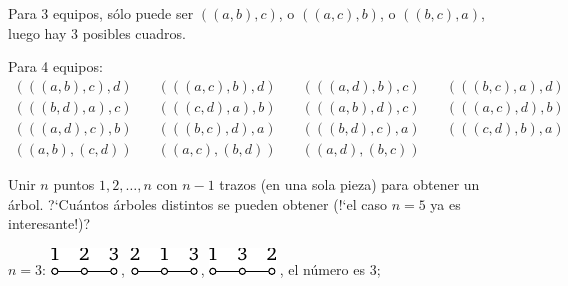 \documentclass[12pt]{article}  %
\begin{document}
Para 3 equipos, s\'olo puede ser $((a,b),c)$, o $((a,c),b)$, o $((b,c),a)$, luego hay 3 posibles cuadros.

Para 4 equipos:
$$\begin{array}{cccc}
(((a,b),c),d) & \quad (((a,c),b),d) & \quad (((a,d),b),c) & \quad (((b,c),a),d) \\
(((b,d),a),c) & \quad (((c,d),a),b) & \quad (((a,b),d),c) & \quad (((a,c),d),b) \\ 
(((a,d),c),b) & \quad (((b,c),d),a) & \quad (((b,d),c),a) & \quad (((c,d),b),a) \\
((a,b),(c,d)) & \quad ((a,c),(b,d)) & \quad ((a,d),(b,c))
\end{array}$$

\bigskip
{} Unir $n$ puntos $1, 2, \dots, n$ con $n-1$ trazos (en una sola pieza) para obtener un \'arbol. ?`Cu\'antos \'arboles distintos se pueden obtener (!`el caso $n=5$ ya es interesante!)?
 
\medskip

\medskip
$n=3$:\quad 
\includegraphics{taskbook-292}\,,\quad 
\includegraphics{taskbook-293}\,,\quad 
\includegraphics{taskbook-294}\,,\quad 
el n\'umero es 3;
\end{document}
